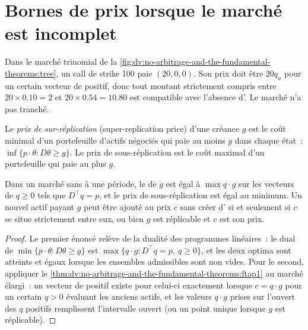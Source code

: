 \section{Bornes de prix lorsque le marché est incomplet}

Dans le marché trinomial de la \cref{fig:dv:no-arbitrage-and-the-fundamental-theorems:tree},
un call de strike 100 paie $(20,0,0)$. Son prix doit être $20q_u$ pour un certain
vecteur de  positif, donc tout montant strictement compris entre $20\times0.10=2$ et
$20\times0.54=10.80$ est compatible avec l'absence d'. Le marché n'a pas tranché.

\begin{definition}\label{def:dv:no-arbitrage-and-the-fundamental-theorems:super}
Le \emph{prix de sur-réplication} (super-replication price) d'une créance
$g$ est le coût minimal d'un portefeuille d'actifs négociés qui paie au moins $g$ dans
chaque état~: $\inf\{p\cdot\theta: D\theta\ge g\}$. Le prix de sous-réplication est le
coût maximal d'un portefeuille qui paie au plus $g$.
\end{definition}

\begin{proposition}\label{prop:dv:no-arbitrage-and-the-fundamental-theorems:interval}
Dans un marché sans  à une période, le  de $g$ est égal à
$\max q\cdot g$ sur les vecteurs de  $q\ge0$ tels que $D^\top q=p$, et le
prix de sous-réplication est égal au minimum. Un nouvel actif payant $g$ peut être ajouté au
prix $c$ sans créer d' si et seulement si $c$ se situe strictement entre
eux, ou bien $g$ est réplicable et $c$ est son prix.
\end{proposition}
\begin{proof}
Le premier énoncé relève de la dualité des programmes linéaires~: le dual de $\min\{p\cdot
\theta:D\theta\ge g\}$ est $\max\{q\cdot g:D^\top q=p,\ q\ge0\}$, et les deux optima
sont atteints et égaux lorsque les ensembles admissibles sont non vides. Pour le second,
appliquer le \cref{thm:dv:no-arbitrage-and-the-fundamental-theorems:ftap1} au
marché élargi~: un vecteur de  positif existe pour celui-ci exactement lorsque
$c=q\cdot g$ pour un certain $q>0$ évaluant les anciens actifs, et les valeurs $q\cdot g$ prises
sur l'ouvert des $q$ positifs remplissent l'intervalle ouvert (ou un point unique lorsque $g$
est réplicable).
\end{proof}


